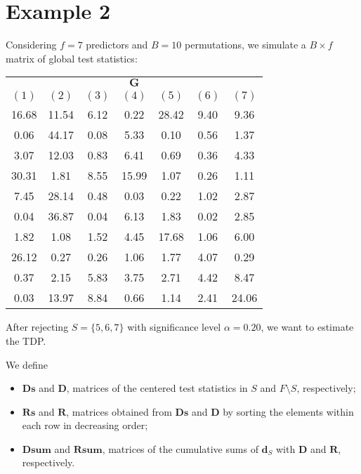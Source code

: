 \documentclass[11pt,a4paper,openright,twoside]{article}
\begin{document}
\newpage
\section{Example 2}
Considering $f=7$ predictors and $B=10$ permutations, we simulate a $B\times f$ matrix of global test statistics:

\begin{table}[h!]
\centering
\begin{tabular}{ccccccc}
\multicolumn{7}{c}{$\mathbf{G}$}\\
$(1)$ & $(2)$ & $(3)$ & $(4)$ & $(5)$ & $(6)$ & $(7)$\\
\cline{1-7}
16.68 & 11.54 & 6.12 & 0.22 & 28.42 & 9.40 & 9.36\\
0.06 & 44.17 & 0.08 & 5.33 & 0.10 & 0.56 & 1.37\\
3.07 & 12.03 & 0.83 & 6.41 & 0.69 & 0.36 & 4.33\\
30.31 & 1.81 & 8.55 & 15.99 & 1.07 & 0.26 & 1.11\\
7.45 & 28.14 & 0.48 & 0.03 & 0.22 & 1.02 & 2.87\\
0.04 & 36.87 & 0.04 & 6.13 & 1.83 & 0.02 & 2.85\\
1.82 & 1.08 & 1.52 & 4.45 & 17.68 & 1.06 & 6.00\\
26.12 & 0.27 & 0.26 & 1.06 & 1.77 & 4.07 & 0.29\\
0.37 & 2.15 & 5.83 & 3.75 & 2.71 & 4.42 & 8.47\\
0.03 & 13.97 & 8.84 & 0.66 & 1.14 & 2.41 & 24.06
\end{tabular}
\end{table}

After rejecting $S=\{5,6,7\}$ with significance level $\alpha=0.20$, we want to estimate the TDP.

We define
\begin{itemize}
\item $\mathbf{Ds}$ and $\mathbf{D}$, matrices of the centered test statistics in $S$ and $F\setminus S$, respectively;
\item $\mathbf{Rs}$ and $\mathbf{R}$, matrices obtained from $\mathbf{Ds}$ and $\mathbf{D}$ by sorting the elements within each row in decreasing order;
\item $\mathbf{Dsum}$ and $\mathbf{Rsum}$, matrices of the cumulative sums of $\mathbf{d}_S$ with $\mathbf{D}$ and $\mathbf{R}$, respectively.
\end{itemize}
\end{document}
